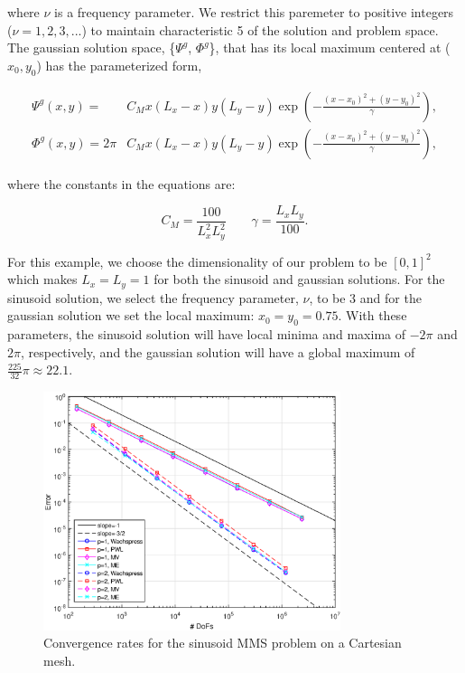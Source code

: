 \noindent where $\nu$ is a frequency parameter. We restrict this paremeter to positive integers ($\nu = 1,2,3,...$) to maintain characteristic 5 of the solution and problem space. The gaussian solution space, \{$\Psi^g$, $\Phi^g$\}, that has its local maximum centered at ($x_0,y_0$) has the parameterized form,

\begin{equation}
\label{eq::BF_Results_MMS_gaussfluxsols}
\begin{aligned}
\Psi^g (x,y) = &C_M x (L_x - x) y (L_y - y) \exp(-\frac{(x-x_0)^2 + (y-y_0)^2}{\gamma}), \\ 
\Phi^g (x,y) = 2 \pi &C_M x (L_x - x) y (L_y - y) \exp(-\frac{(x-x_0)^2 + (y-y_0)^2}{\gamma}),
\end{aligned} 
\end{equation}

\noindent where the constants in the equations are:

\begin{equation}
\label{eq::BF_Results_MMS_gaussconsts}
C_M = \frac{100}{L_x^2 L_y^2} \qquad \gamma = \frac{L_x L_y}{100} .
\end{equation}

For this example, we choose the dimensionality of our problem to be $[0,1]^2$ which makes $L_x=L_y=1$ for both the sinusoid and gaussian solutions. For the sinusoid solution, we select the frequency parameter, $\nu$, to be 3 and for the gaussian solution we set the local maximum: $x_0=y_0 = 0.75$. With these parameters, the sinusoid solution will have local minima and maxima of $-2 \pi$ and $2 \pi$, respectively, and the gaussian solution will have a global maximum of $\frac{225}{32} \pi \approx 22.1$.

\begin{figure}
\centering
\includegraphics[width=0.775\textwidth]{figures/sec_BF/TransMMS_Sine_cart_err.eps}
\caption{Convergence rates for the sinusoid MMS problem on a Cartesian mesh.}
\label{fig::BF_Results_MMS_Sine_cart}
\end{figure}

